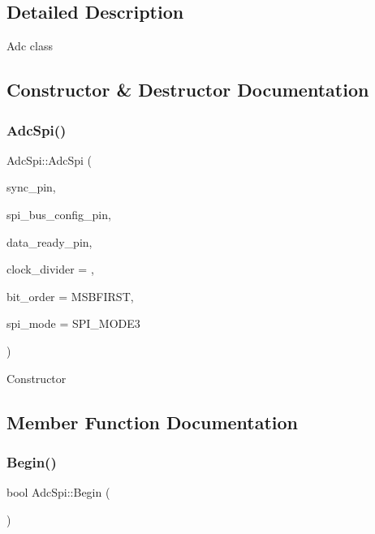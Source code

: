 \subsection{Detailed Description}
Adc class 

\subsection{Constructor \& Destructor Documentation}
\mbox{\label{classAdcSpi_a5b3afab7dc4a788e1caf6a1277b67df9}} 
\subsubsection{\texorpdfstring{Adc\+Spi()}{AdcSpi()}}
{\footnotesize\ttfamily Adc\+Spi\+::\+Adc\+Spi (\begin{DoxyParamCaption}\item[{uint8\+\_\+t}]{sync\+\_\+pin,  }\item[{uint8\+\_\+t}]{spi\+\_\+bus\+\_\+config\+\_\+pin,  }\item[{uint8\+\_\+t}]{data\+\_\+ready\+\_\+pin,  }\item[{uint8\+\_\+t}]{clock\+\_\+divider = {},  }\item[{Bit\+Order}]{bit\+\_\+order = {\ttfamily MSBFIRST},  }\item[{uint8\+\_\+t}]{spi\+\_\+mode = {\ttfamily SPI\+\_\+MODE3} }\end{DoxyParamCaption})}

Constructor 

\subsection{Member Function Documentation}
\mbox{\label{classAdcSpi_aa8f8f27578dd85cfcdbc9439bbce66cb}} 
\subsubsection{\texorpdfstring{Begin()}{Begin()}}
{\footnotesize\ttfamily bool Adc\+Spi\+::\+Begin (\begin{DoxyParamCaption}\item[{void}]{ }\end{DoxyParamCaption})}

